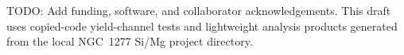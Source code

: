 \begin{acknowledgements}
TODO: Add funding, software, and collaborator acknowledgements. This draft uses copied-code yield-channel tests and lightweight analysis products generated from the local NGC~1277 Si/Mg project directory.
\end{acknowledgements}
